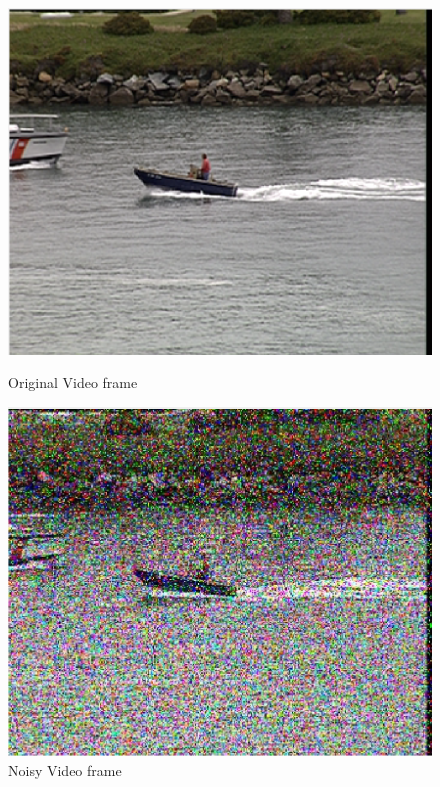 \documentclass{article}
\begin{document}
\begin{figure}[H]
    \centering
    \begin{minipage}{.45\textwidth}
        \centering
        \includegraphics[width=\linewidth]{Images/Coastguard_original.png}
        \caption{Original Video frame}
        \label{fig:totalpowervst}
    \end{minipage}
    \begin{minipage}{.45\textwidth}
        \centering
        \includegraphics[width=\linewidth]{Images/Coastguard_2_noisy.png}
        \caption{Noisy Video frame}
    \end{minipage}
\end{figure}
\end{document}
